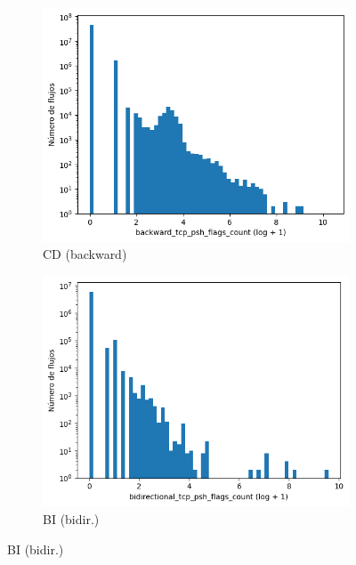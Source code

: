 \begin{figure}[H]
\begin{subfigure}[b]{0.26\textwidth}
        \includegraphics[width=\textwidth]{media/packet_pincer_cicddos/backward_tcp_psh_flags_count_log_x_log_y.png}
        \caption{CD (backward)}
    \end{subfigure}
    \hfill
    \begin{subfigure}[b]{0.26\textwidth}
        \centering
        \includegraphics[width=\linewidth]{media/packet_pincer_botiot/bidirectional_tcp_psh_flags_count_log_x_log_y.png}
        \caption{BI (bidir.)}

\end{subfigure}
\end{figure}
